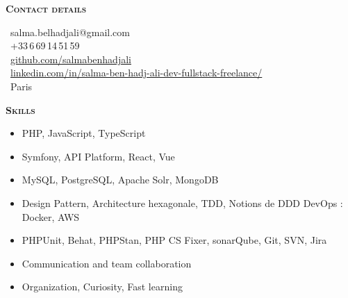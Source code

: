 \documentclass[11pt, a4paper]{article}
\newcommand{\headleft}[1]{\vspace*{3ex}\textsc{\textbf{#1}}\par%
    \vspace*{-1.5ex}\hrulefill\par\vspace*{0.7ex}}
\begin{document}
\setlength{\topskip}{0pt}
\setlength{\parindent}{0pt}
\setlength{\parskip}{0pt}
\setlength{\fboxsep}{0pt}
\pagestyle{empty}
\raggedbottom

\begin{minipage}[t]{0.33\textwidth} %

\vspace{-.2ex} %
\colorbox{cvblue!90}{\color{white}  %
\textwidth\relax%
\begin{minipage}[t][298mm][t]{0.82\textwidth}
\raggedright
\vspace*{6.5ex}

\begin{center}
\end{center}

\vspace*{1cm}

\headleft{Contact details}
\MVAt\ {\small salma.belhadjali@gmail.com} \\[0.3cm]
\Mobilefone\ +33\,6\,69\,14\,51\,59 \\[0.3cm]
\Mundus\ \href{https://github.com/salmabenhadjali}{github.com/salmabenhadjali} \\[0.3cm]
\Mundus\ \href{https://www.linkedin.com/in/salma-ben-hadj-ali-dev-fullstack-freelance/}
{linkedin.com/in/salma-ben-hadj-ali-dev-fullstack-freelance/} \\[0.3cm]
\Letter\ Paris
\normalsize

\vspace*{2cm}

\headleft{Skills}
\begin{itemize}
\item PHP, JavaScript, TypeScript
\item Symfony, API Platform, React, Vue
\item MySQL, PostgreSQL, Apache Solr, MongoDB
\item Design Pattern, Architecture hexagonale, TDD, Notions de DDD DevOps : Docker, AWS
\item PHPUnit, Behat, PHPStan, PHP CS Fixer, sonarQube, Git, SVN, Jira
\item Communication and team collaboration
\item Organization, Curiosity, Fast learning

\end{itemize} 

\end{minipage}%
\textwidth\relax%
}
\end{minipage}%
\end{document}
